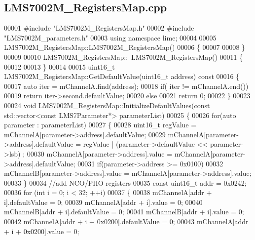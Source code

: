 \subsection{L\+M\+S7002\+M\+\_\+\+Registers\+Map.\+cpp}
\label{LMS7002M__RegistersMap_8cpp_source}

\begin{DoxyCode}
00001 \textcolor{preprocessor}{#include "LMS7002M_RegistersMap.h"}
00002 \textcolor{preprocessor}{#include "LMS7002M_parameters.h"}
00003 \textcolor{keyword}{using namespace }lime;
00004 
00005 LMS7002M_RegistersMap::LMS7002M_RegistersMap()
00006 \{
00007 
00008 \}
00009 
00010 LMS7002M_RegistersMap::~LMS7002M_RegistersMap()
00011 \{
00012 
00013 \}
00014 
00015 uint16\_t LMS7002M_RegistersMap::GetDefaultValue(uint16\_t address)\textcolor{keyword}{ const}
00016 \textcolor{keyword}{}\{
00017     \textcolor{keyword}{auto} iter = mChannelA.find(address);
00018     \textcolor{keywordflow}{if}( iter != mChannelA.end())
00019         \textcolor{keywordflow}{return} iter->second.defaultValue;
00020     \textcolor{keywordflow}{else}
00021         \textcolor{keywordflow}{return} 0;
00022 \}
00023 
00024 \textcolor{keywordtype}{void} LMS7002M_RegistersMap::InitializeDefaultValues(\textcolor{keyword}{const} std::vector<const LMS7Parameter*> parameterList)
00025 \{
00026     \textcolor{keywordflow}{for}(\textcolor{keyword}{auto} parameter : parameterList)
00027     \{
00028         uint16\_t regValue = mChannelA[parameter->address].defaultValue;
00029         mChannelA[parameter->address].defaultValue = regValue | (parameter->defaultValue << parameter->lsb)
      ;
00030         mChannelA[parameter->address].value = mChannelA[parameter->address].defaultValue;
00031         \textcolor{keywordflow}{if}(parameter->address >= 0x0100)
00032             mChannelB[parameter->address].value = mChannelA[parameter->address].value;
00033     \}
00034     \textcolor{comment}{//add NCO/PHO registers}
00035     \textcolor{keyword}{const} uint16\_t addr = 0x0242;
00036     \textcolor{keywordflow}{for} (\textcolor{keywordtype}{int} i = 0; i < 32; ++i)
00037     \{
00038         mChannelA[addr + i].defaultValue = 0;
00039         mChannelA[addr + i].value = 0;
00040         mChannelB[addr + i].defaultValue = 0;
00041         mChannelB[addr + i].value = 0;
00042         mChannelA[addr + i + 0x0200].defaultValue = 0;
00043         mChannelA[addr + i + 0x0200].value = 0;

\end{DoxyCode}
